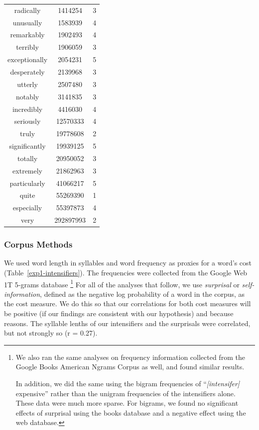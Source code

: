 \documentclass[10pt,letterpaper]{article}
\newcommand{\w}[1]{\emph{#1}}
\newcommand{\todo}[1]{{\color{red}#1}}
\begin{document}
\begin{table}[ht]
\begin{center}
\begin{tabular}{ccc}
    radically & 1414254 & 3 \\
    unusually & 1583939 & 4 \\
    remarkably & 1902493 & 4 \\
    terribly & 1906059 & 3 \\
    exceptionally & 2054231 & 5 \\
    desperately & 2139968 & 3 \\
    utterly & 2507480 & 3 \\
    notably & 3141835 & 3 \\
    incredibly & 4416030 & 4 \\
    seriously & 12570333 & 4 \\
    truly & 19778608 & 2 \\
    significantly & 19939125 & 5 \\
    totally & 20950052 & 3 \\
    extremely & 21862963 & 3 \\
    particularly & 41066217 & 5 \\
    quite & 55269390 & 1 \\
    especially & 55397873 & 4 \\
    very & 292897993 & 2
  \end{tabular}
 \end{center}
\end{table}

\subsubsection{Corpus Methods}

We used word length in syllables and word frequency as proxies for a word's cost (Table~\ref{exp1-intensifiers}).
The frequencies were collected from the Google Web 1T 5-grams database \cite{web1t5gram}\footnote{
We also ran the same analyses on frequency information collected from the Google Books American Ngrams Corpus \cite{books2011} as well, and found similar results.

In addition, we did the same using the bigram frequencies of ``\emph{[intensifer]} expensive'' rather than the unigram frequencies of the intensifiers alone. These data were much more sparse. For bigrams, we found no significant effects of surprisal using the books database and a negative effect using the web database.
}
For all of the analyses that follow, we use \w{surprisal} or \w{self-information}, defined as the negative log probability of a word in the corpus, as the cost measure. We do this so that our correlations for both cost measures will be positive (if our findings are consistent with our hypothesis) and because \todo{reasons}. The syllable lenths of our intensifiers and the surprisals %
were correlated, but not strongly so (r = 0.27).
\end{document}
